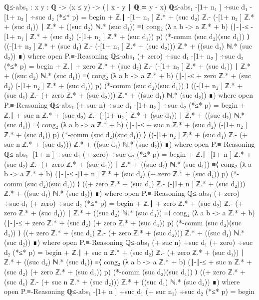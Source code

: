 \documentclass[11pt,a4paper]{article}
\begin{document}
\begin{code}
ℚ≤-abs₁ : {x y : ℚ} -> (x ≤ y) -> (∣ x - y ∣ ℚ.≃ y - x)
ℚ≤-abs₁ { -[1+ n₁ ] ÷suc d₁} { -[1+ n₂ ] ÷suc d₂} (*≤* p) = begin
    + ℤ.∣ -[1+ n₁ ] ℤ.* + (suc d₂) ℤ.- (-[1+  n₂ ] ℤ.* + (suc d₁)) ∣
    ℤ.* + ((suc d₂) ℕ.* (suc d₁)) ≡⟨ cong₂ (λ a b -> a ℤ.* + b)
    (∣-∣-≤ { -[1+ n₁ ] ℤ.* + (suc d₂)}{ (-[1+  n₂ ] ℤ.* + (suc d₁))} p)
    (*-comm (suc d₂)(suc d₁)) ⟩
  ((-[1+  n₂ ] ℤ.* + (suc d₁) ℤ.- (-[1+ n₁ ] ℤ.* + (suc d₂))) ℤ.*
  + ((suc d₁) ℕ.* (suc d₂)) ∎)
     where
     open P.≡-Reasoning
ℚ≤-abs₁ {(+ zero) ÷suc d₁} { -[1+ n₂ ] ÷suc d₂} (*≤* p) = begin
    + ℤ.∣ + zero ℤ.* + (suc d₂) ℤ.- (-[1+  n₂ ] ℤ.* + (suc d₁)) ∣
    ℤ.* + ((suc d₂) ℕ.* (suc d₁)) ≡⟨ cong₂ (λ a b -> a ℤ.* + b)
    (∣-∣-≤ { + zero ℤ.* + (suc d₂)}{ (-[1+  n₂ ] ℤ.* + (suc d₁))} p)
    (*-comm (suc d₂)(suc d₁)) ⟩
  ((-[1+  n₂ ] ℤ.* + (suc d₁) ℤ.- (+ zero ℤ.* + (suc d₂))) ℤ.*
  + ((suc d₁) ℕ.* (suc d₂)) ∎)
     where
     open P.≡-Reasoning
ℚ≤-abs₁ {(+ suc n) ÷suc d₁} { -[1+ n₂ ] ÷suc d₂} (*≤* p) = begin
    + ℤ.∣ + suc n ℤ.* + (suc d₂) ℤ.- (-[1+  n₂ ] ℤ.* + (suc d₁))
    ∣ ℤ.* + ((suc d₂) ℕ.* (suc d₁)) ≡⟨ cong₂ (λ a b -> a ℤ.* + b)
    (∣-∣-≤ { + suc n ℤ.* + (suc d₂)}{ (-[1+  n₂ ] ℤ.* + (suc d₁))} p)
    (*-comm (suc d₂)(suc d₁)) ⟩
  ((-[1+  n₂ ] ℤ.* + (suc d₁) ℤ.- (+ suc n ℤ.* + (suc d₂))) ℤ.*
  + ((suc d₁) ℕ.* (suc d₂)) ∎)
     where
     open P.≡-Reasoning
ℚ≤-abs₁ { -[1+ n ] ÷suc d₁} {(+ zero) ÷suc d₂} (*≤* p) = begin
    + ℤ.∣ -[1+ n ] ℤ.* + (suc d₂) ℤ.- (+ zero ℤ.* + (suc d₁)) ∣
    ℤ.* + ((suc d₂) ℕ.* (suc d₁)) ≡⟨ cong₂ (λ a b -> a ℤ.* + b)
    (∣-∣-≤ { -[1+ n ] ℤ.* + (suc d₂)}{ (+ zero ℤ.* + (suc d₁))} p)
    (*-comm (suc d₂)(suc d₁)) ⟩
  ((+ zero ℤ.* + (suc d₁) ℤ.- (-[1+ n ] ℤ.* + (suc d₂))) ℤ.*
  + ((suc d₁) ℕ.* (suc d₂)) ∎)
     where
     open P.≡-Reasoning
ℚ≤-abs₁ {(+ zero) ÷suc d₁} {(+ zero) ÷suc d₂} (*≤* p) = begin
    + ℤ.∣ + zero ℤ.* + (suc d₂) ℤ.- (+ zero ℤ.* + (suc d₁)) ∣ ℤ.*
    + ((suc d₂) ℕ.* (suc d₁)) ≡⟨ cong₂ (λ a b -> a ℤ.* + b)
    (∣-∣-≤ { + zero ℤ.* + (suc d₂)}{ (+ zero ℤ.* + (suc d₁))} p)
    (*-comm (suc d₂)(suc d₁)) ⟩
  ((+ zero ℤ.* + (suc d₁) ℤ.- (+ zero ℤ.* + (suc d₂))) ℤ.*
  + ((suc d₁) ℕ.* (suc d₂)) ∎)
     where
     open P.≡-Reasoning
ℚ≤-abs₁ {(+ suc n) ÷suc d₁} {(+ zero) ÷suc d₂} (*≤* p) = begin
    + ℤ.∣ + suc n ℤ.* + (suc d₂) ℤ.- (+ zero ℤ.* + (suc d₁)) ∣
    ℤ.* + ((suc d₂) ℕ.* (suc d₁)) ≡⟨ cong₂ (λ a b -> a ℤ.* + b)
    (∣-∣-≤ { + suc n ℤ.* + (suc d₂)}{ (+ zero ℤ.* + (suc d₁))} p)
    (*-comm (suc d₂)(suc d₁)) ⟩
  ((+ zero ℤ.* + (suc d₁) ℤ.- (+ suc n ℤ.* + (suc d₂))) ℤ.*
  + ((suc d₁) ℕ.* (suc d₂)) ∎)
     where
     open P.≡-Reasoning
ℚ≤-abs₁ { -[1+ n ] ÷suc d₁} {(+ suc n₁) ÷suc d₂} (*≤* p) = begin

\end{code}
\end{document}

